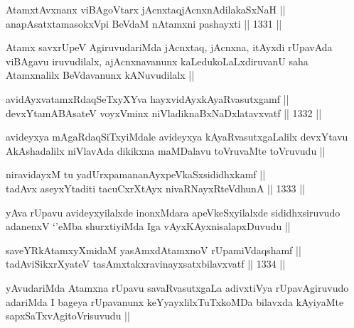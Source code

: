 
\begin{shl}
AtamxtAvxnanx viBAgoV\s tarx jAcnxtaqjAcnxnAdilakaSxNaH ||  \\
anapAsatxtamasokxV\s pi BeVdaM nA\s \s tamxni pashayxti ||  1331 ||  
\end{shl}

\begin{artha}
Atamx savxrUpeV AgiruvudariMda jAcnxtaq, jAcnxna, itAyxdi rUpavAda viBAgavu iruvudilalx, ajAcnxnavanunx kaLedukoLaLxdiruvanU saha Atamxnalilx BeVdavanunx kANuvudilalx ||
\end{artha}


\begin{shl}
avidAyxvatamxRdaqSeTxyXYva hayxvidAyxkAyaRvasutxgamf ||  \\
devxYtamABAsateV voyxVminx niVladiknaBxNaDxlatavxvatf ||  1332 ||  
\end{shl}

\begin{artha}
avideyxya mAgaRdaqSiTxyiMdale avideyxya kAyaRvasutxgaLalilx devxYtavu AkAshadalilx niVlavAda dikikxna maMDalavu toVruvaMte toVruvudu ||
\end{artha}


\begin{shl}
niravidayxM tu yadUrxpamananAyxpeVkaSxsididhxkamf || \\
tadAvx aseyxYtaditi tacuCxrXtAyx nivaRNayxRteV\s dhunA ||  1333 ||  
\end{shl}

\begin{artha}
yAva rUpavu avideyxyilalxde inonxMdara apeVkeSxyilalxde sididhxsiruvudo adanenxV `\stext'eMba shurxtiyiMda Iga vAyxKAyxnisalapxDuvudu ||
\end{artha}

\begin{shl}
saveYRkAtamxyXmidaM yasAmxdAtamxnoV rUpamiVdaqshamf || \\
tadAviSikxrXyateV tasAmxtakxravinayxsatxbilavxvatf ||  1334 ||  
\end{shl}

\begin{artha}
yAvudariMda Atamxna rUpavu savaRvasutxgaLa adivxtiVya rUpavAgiruvudo adariMda I bageya rUpavanunx keYyayxlilxTuTxkoMDa bilavxda kAyiyaMte sapxSaTxvAgitoVrisuvudu ||
\end{artha}

